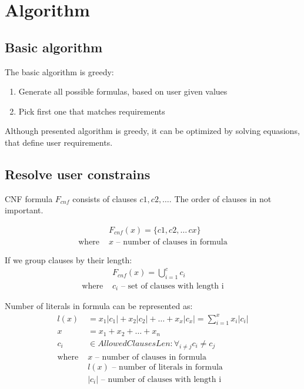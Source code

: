 \chapter{Algorithm}

\section{Basic algorithm}

The basic algorithm is greedy:
\begin{enumerate}
	\item Generate all possible formulas, based on user given values
	\item Pick first one that matches requirements
\end{enumerate}

Although presented algorithm is greedy, it can be optimized by solving equasions, that define user requirements.

\section{Resolve user constrains}

CNF formula $F_{cnf}$ consists of clauses $c1, c2, \dots$. The order of clauses in not important.

\begin{align*}
	&F_{cnf}(x) = \{c1, c2, \dots\, cx\} \\
	\text{where }
		&x \text{ -- number of clauses in formula}
\end{align*}

If we group clauses by their length:
\begin{align*}
	&F_{cnf}(x) = \bigcup_{i=1}^c c_i \\
	\text{where }
		&c_i \text{ -- set of clauses with length i}
\end{align*}

Number of literals in formula can be represented as:
\begin{align*}
	l(x) &= x_1|c_1| + x_2|c_2| + \dots + x_x|c_x| = \sum_{i=1}^{x} x_i |c_i| \\
	x &= x_1 + x_2 + \dots + x_n \\
	c_i &\in AllowedClausesLen: \forall_{i \neq j} c_i \neq c_j  \\
	\text{where }
		&x \text{ -- number of clauses in formula} \\
		&l(x) \text{ -- number of literals in formula} \\
		&|c_i| \text{ -- number of clauses with length i} \\
\end{align*}

